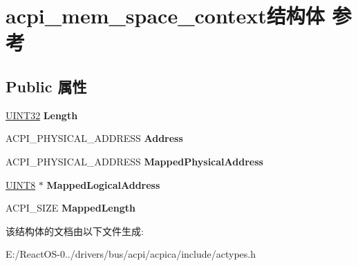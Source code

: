 \hypertarget{structacpi__mem__space__context}{}\section{acpi\+\_\+mem\+\_\+space\+\_\+context结构体 参考}
\label{structacpi__mem__space__context}
\subsection*{Public 属性}
\begin{DoxyCompactItemize}
\item 
\mbox{\label{structacpi__mem__space__context_a6201e3baba0c78ef305756aed92f233d}} 
\hyperlink{_processor_bind_8h_ae1e6edbbc26d6fbc71a90190d0266018}{U\+I\+N\+T32} {\bfseries Length}
\item 
\mbox{\label{structacpi__mem__space__context_a9a5f44af1cd479ae89bcfcb6da487c62}} 
A\+C\+P\+I\+\_\+\+P\+H\+Y\+S\+I\+C\+A\+L\+\_\+\+A\+D\+D\+R\+E\+SS {\bfseries Address}
\item 
\mbox{\label{structacpi__mem__space__context_a35d8ce326b5150505b7f2ee52b682650}} 
A\+C\+P\+I\+\_\+\+P\+H\+Y\+S\+I\+C\+A\+L\+\_\+\+A\+D\+D\+R\+E\+SS {\bfseries Mapped\+Physical\+Address}
\item 
\mbox{\label{structacpi__mem__space__context_a76f89e1c9fbef8501b50950775d005cc}} 
\hyperlink{_processor_bind_8h_ab27e9918b538ce9d8ca692479b375b6a}{U\+I\+N\+T8} $\ast$ {\bfseries Mapped\+Logical\+Address}
\item 
\mbox{\label{structacpi__mem__space__context_a9c8cbb2176b2e81a2e4763f83a7100e5}} 
A\+C\+P\+I\+\_\+\+S\+I\+ZE {\bfseries Mapped\+Length}
\end{DoxyCompactItemize}


该结构体的文档由以下文件生成\+:\begin{DoxyCompactItemize}
\item 
E\+:/\+React\+O\+S-\/0../drivers/bus/acpi/acpica/include/actypes.\+h\end{DoxyCompactItemize}
